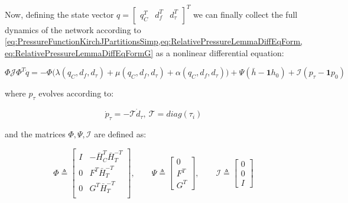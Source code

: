 Now, defining the state vector $q = \begin{bmatrix}q_C^T & d_f^T & d_{\tau}^T \end{bmatrix}^T$ we can finally collect the full dynamics of the network according to \cref{eq:PressureFunctionKirchJPartitionsSimp,eq:RelativePressureLemmaDiffEqForm,eq:RelativePressureLemmaDiffEqFormG} as a nonlinear differential equation:

\begin{equation}\label{eq:NonLinearModelWithTank}
	\Phi\mathcal{J}\Phi^T \dot{q} = -\Phi\Big(\lambda(q_C,d_f,d_{\tau})+\mu(q_C,d_f,d_{\tau})+\alpha(q_C,d_f,d_{\tau})\Big) + \Psi(\bar{h}-\mathbf{1}h_0) + \mathcal{I}(p_{\tau}-\mathbf{1}p_0)
\end{equation}

where $p_{\tau}$ evolves according to:

\begin{equation}\label{eq:TankDynamics}
	\dot{p}_{\tau} = - \mathcal{T} \dot{d}_{\tau}, \ \mathcal{T} = diag(\tau_i)
\end{equation}

and the matrices $\Phi, \Psi, \mathcal{I}$ are defined as:

\begin{equation}\label{eq:NonLinearModelMatrices}
	\Phi \triangleq 
	\begin{bmatrix} 
		I & -\bar{H}_C^T\bar{H}_T^{-T} \\ 0 & F^T\bar{H}_T^{-T} \\ 0  & G^T\bar{H}_T^{-T} \\ 
	\end{bmatrix}
	, \qquad
	\Psi \triangleq
	\begin{bmatrix}
		0 \\ F^T \\ G^T
	\end{bmatrix}
	, \qquad
	\mathcal{I} \triangleq
	\begin{bmatrix}
		0 \\ 0 \\ I
	\end{bmatrix}
\end{equation}
